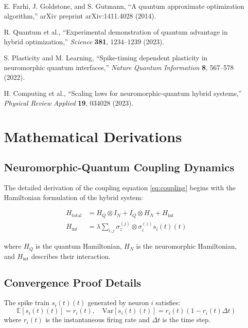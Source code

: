 \documentclass[arxiv,final,oneside,onecolumn]{arxiv-preprint-simple}
\newcommand{\spike}[1]{s_{#1}(t)}
\begin{document}
\begin{thebibliography}{99}
E. Farhi, J. Goldstone, and S. Gutmann,
``A quantum approximate optimization algorithm,''
arXiv preprint arXiv:1411.4028 (2014).

R. Quantum et al.,
``Experimental demonstration of quantum advantage in hybrid optimization,''
\textit{Science} \textbf{381}, 1234--1239 (2023).

S. Plasticity and M. Learning,
``Spike-timing dependent plasticity in neuromorphic quantum interfaces,''
\textit{Nature Quantum Information} \textbf{8}, 567--578 (2022).

H. Computing et al.,
``Scaling laws for neuromorphic-quantum hybrid systems,''
\textit{Physical Review Applied} \textbf{19}, 034028 (2023).

\end{thebibliography}

\appendix

\section{Mathematical Derivations}
\label{app:math}

\subsection{Neuromorphic-Quantum Coupling Dynamics}

The detailed derivation of the coupling equation \eqref{eq:coupling} begins with the Hamiltonian formulation of the hybrid system:

\begin{align}
H_{\text{total}} &= H_Q \otimes I_N + I_Q \otimes H_N + H_{\text{int}} \\
H_{\text{int}} &= \lambda \sum_{i,j} \sigma_z^{(j)} \otimes \sigma_i^{(z)} \spike{i}(t)
\end{align}

where $H_Q$ is the quantum Hamiltonian, $H_N$ is the neuromorphic Hamiltonian, and $H_{\text{int}}$ describes their interaction.

\subsection{Convergence Proof Details}

\begin{lemma}
The spike train $\spike{i}(t)$ generated by neuron $i$ satisfies:
\begin{equation}
\mathbb{E}[\spike{i}(t)] = r_i(t), \quad \text{Var}[\spike{i}(t)] = r_i(t)(1-r_i(t)\Delta t)
\end{equation}
where $r_i(t)$ is the instantaneous firing rate and $\Delta t$ is the time step.
\end{lemma}
\end{document}
